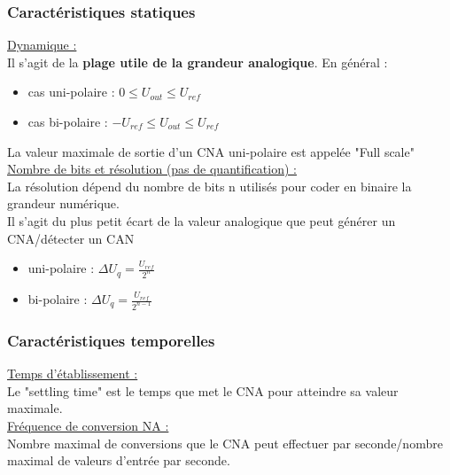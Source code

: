 \documentclass[../main.tex]{subfiles}
\begin{document}
\subsubsection{Caractéristiques statiques}

\quad \underline{Dynamique :} \\
Il s'agit de la \textbf{plage utile de la grandeur analogique}. En général : \begin{itemize}
    \item cas uni-polaire : $0\leq U_{out} \leq U_{ref}$\\
    \item cas bi-polaire : $-U_{ref} \leq U_{out} \leq U_{ref}$\\
\end{itemize}

La valeur maximale de sortie d'un CNA uni-polaire est appelée "Full scale"\\

\quad \underline{Nombre de bits et résolution (pas de quantification) :}\\
La résolution dépend du nombre de bits n utilisés pour coder en binaire la grandeur numérique.\\
Il s'agit du plus petit écart de la valeur analogique que peut générer un CNA/détecter un CAN\\

\begin{itemize}
    \item uni-polaire : $\Delta U_q = \frac{U_{ref}}{2^n}$\\
    \item bi-polaire : $\Delta U_q = \frac{U_{ref}}{2^{n-1}}$\\
\end{itemize}

\subsubsection{Caractéristiques temporelles}

\quad \underline{Temps d'établissement :}\\
Le "settling time" est le temps que met le CNA pour atteindre sa valeur maximale.\\

\quad \underline{Fréquence de conversion NA :}\\
Nombre maximal de conversions que le CNA peut effectuer par seconde/nombre maximal de valeurs d'entrée par seconde.\\
\end{document}
